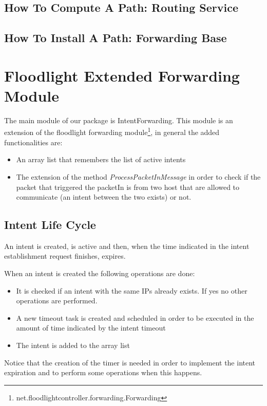 \documentclass[a4paper]{report}
\begin{document}
	\subsection{How To Compute A Path: Routing Service}
	\subsection{How To Install A Path: Forwarding Base}
	
	
	\section{Floodlight Extended Forwarding Module}\label{forwarding}
	\noindent The main module of our package is IntentForwarding. This module is an extension of the floodlight  forwarding module\footnote{net.floodlightcontroller.forwarding.Forwarding}, in general the added functionalities are:
	
	\begin{itemize}
		\item An array list that remembers the list of active intents
		\item The extension of the method \textit{ProcessPacketInMessage} in order to check if the packet that triggered the packetIn is from two host that are allowed to communicate (an intent between the two exists) or not. 
	\end{itemize}
	

	\subsection{Intent Life Cycle}
	\noindent An intent is created, is active and then, when the time indicated in the intent establishment request finishes, expires.
	
	\noindent When an intent is created the following operations are done:
	\begin{itemize}
		\item It is checked if an intent with the same IPs already exists. If yes no other operations are performed.
		
		\item A new timeout task is created and scheduled in order to be executed in the amount of time indicated by the intent timeout
		
		\item The intent is added to the array list
	\end{itemize}
	
	\noindent Notice that the creation of the timer is needed in order to implement the intent expiration and to perform some operations when this happens.
	
\end{document}
